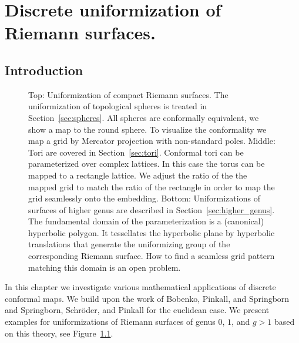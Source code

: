 \documentclass[Thesis]{subfiles}
\begin{document}

\chapter{Discrete uniformization of Riemann surfaces.}
\label{chp:uniformization}

\section{Introduction}

\begin{figure}
\centering
{}
\caption{
Top: Uniformization of compact Riemann surfaces. 
The uniformization of topological spheres is treated in Section~\ref{sec:spheres}.
All spheres are conformally equivalent, we show a map to the round sphere. 
To visualize the conformality we map a grid by Mercator projection with non-standard poles.
Middle: Tori are covered in Section~\ref{sec:tori}.
Conformal tori can be parameterized over complex lattices. 
In this case the torus can be mapped to a rectangle lattice. 
We adjust the ratio of the the mapped grid to match the ratio of the rectangle in order to map the grid seamlessly onto the embedding.
Bottom: Uniformizations of surfaces of higher genus are described in Section~\ref{sec:higher_genus}.
The fundamental domain of the parameterization is a (canonical) hyperbolic polygon. 
It tessellates the hyperbolic plane by hyperbolic translations that generate the uniformizing group of the corresponding Riemann surface.
How to find a seamless grid pattern matching this domain is an open problem.
}
\label{fig:intro_uniformization}
\end{figure}

In this chapter we investigate various mathematical applications of discrete conformal maps. 
We build upon the work of Bobenko, Pinkall, and Springborn \cite{Bobenko2010} and Springborn, Schr\"{o}der, and Pinkall \cite{Springborn2008} for the euclidean case. We present examples for uniformizations of Riemann surfaces of genus $0$, $1$, and $g>1$ based on this theory, see Figure~\ref{fig:intro_uniformization}.
\end{document}
